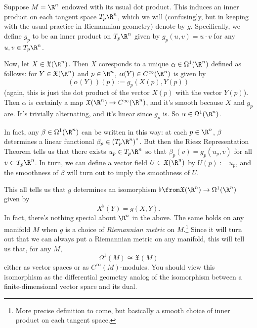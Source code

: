 \begin{example}\label{ex:vector fields and 1-forms}
	Suppose $M = \R^n$ endowed with its usual dot product. This induces an inner product on each tangent space $T_p \R^n$, which we will (confusingly, but in keeping with the usual practice in Riemannian geometry) denote by $g$. Specifically, we define $g_p$ to be an inner product on $T_p\R^n$ given by $g_p(u,v) = u \cdot v$ for any $u,v \in T_p\R^n$.
	
	Now, let $X \in \mathfrak{X}(\R^n)$. Then $X$ coresponds to a unique $\alpha \in \Omega^1(\R^n)$ defined as follows: for $Y \in \mathfrak{X}(\R^n)$ and $p \in \R^n$, $\alpha(Y) \in C^\infty(\R^n)$ is given by
	\[
		(\alpha(Y))(p) := g_p(X(p), Y(p))
	\]
	(again, this is just the dot product of the vector $X(p)$ with the vector $Y(p)$). Then $\alpha$ is certainly a map $\mathfrak{X}(\R^n) \to C^\infty(\R^n)$, and it's smooth because $X$ and $g_p$ are. It's trivially alternating, and it's linear since $g_p$ is. So $\alpha \in \Omega^1(\R^n)$.
	
	In fact, any $\beta \in \Omega^1(\R^n)$ can be written in this way: at each $p \in \R^n$, $\beta$ determines a linear functional $\beta_p \in \left(T_p\R^n\right)^\ast$. But then the Riesz Representation Theorem tells us that there exists $u_p \in T_p \R^n$ so that $\beta_p(v) = g_p(u_p,v)$ for all $v \in T_p\R^n$. In turn, we can define a vector field $U \in \mathfrak{X}(\R^n)$ by $U(p) := u_p$, and the smoothness of $\beta$ will turn out to imply the smoothness of $U$. 
	
	This all tells us that $g$ determines an isomorphism $\flat \from \mathfrak{X}(\R^n) \to \Omega^1(\R^n)$ given by
	\[
		X^\flat(Y) = g(X,Y).
	\]
	In fact, there's nothing special about $\R^n$ in the above. The same holds on any manifold $M$ when $g$ is a choice of \emph{Riemannian metric} on $M$.\footnote{More precise definition to come, but basically a smooth choice of inner product on each tangent space.} Since it will turn out that we can always put a Riemannian metric on any manifold, this will tell us that, for any $M$,
	\[
		\Omega^1(M) \cong \mathfrak{X}(M)
	\]
	either as vector spaces or as $C^\infty(M)$-modules. You should view this isomorphism as the differential geometry analog of the isomorphism between a finite-dimensional vector space and its dual.
\end{example}

